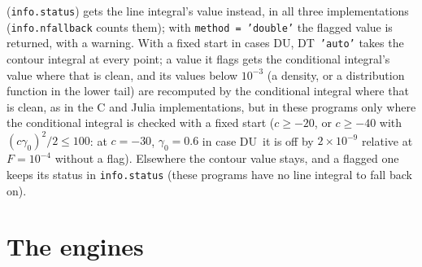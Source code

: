 \documentclass[11pt]{article}
\newcommand{\code}[1]{\texttt{#1}}
\newcommand{\Fu}{\textsf{DU}}
\newcommand{\Ft}{\textsf{DT}}
\begin{document}
(\code{info.status}) gets the line integral's value instead, in all three implementations (\code{info.nfallback} counts them); with \code{method = 'double'} the flagged value is returned, with a warning.  With a fixed start in cases \Fu, \Ft\ \code{'auto'} takes the contour integral at every point; a value it flags gets the conditional integral's value where that is clean, and its values below $10^{-3}$ (a density, or a distribution function in the lower tail) are recomputed by the conditional integral where that is clean, as in the C and Julia implementations, but in these programs only where the conditional integral is checked with a fixed start ($c\ge-20$, or $c\ge-40$ with $(c\gamma_0)^2/2\le100$: at $c=-30$, $\gamma_0=0.6$ in case \Fu\ it is off by $2\times10^{-9}$ relative at $F=10^{-4}$ without a flag).  Elsewhere the contour value stays, and a flagged one keeps its status in \code{info.status} (these programs have no line integral to fall back on).

\section{The engines}
\label{sec:engines}
\end{document}
